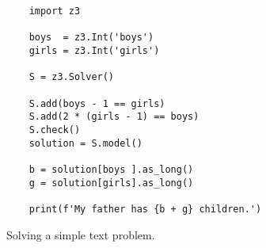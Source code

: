 \begin{figure}[!ht]
\centering
\begin{verbatim}             
    import z3
    
    boys  = z3.Int('boys')
    girls = z3.Int('girls')
    
    S = z3.Solver()
    
    S.add(boys - 1 == girls)
    S.add(2 * (girls - 1) == boys)
    S.check()
    solution = S.model()
    
    b = solution[boys ].as_long()
    g = solution[girls].as_long()
    
    print(f'My father has {b + g} children.')
\end{verbatim}
\vspace*{-0.3cm}
\caption{Solving a simple text problem.}
\label{fig:Brothers-and-Sisters.ipynb}
\end{figure}

